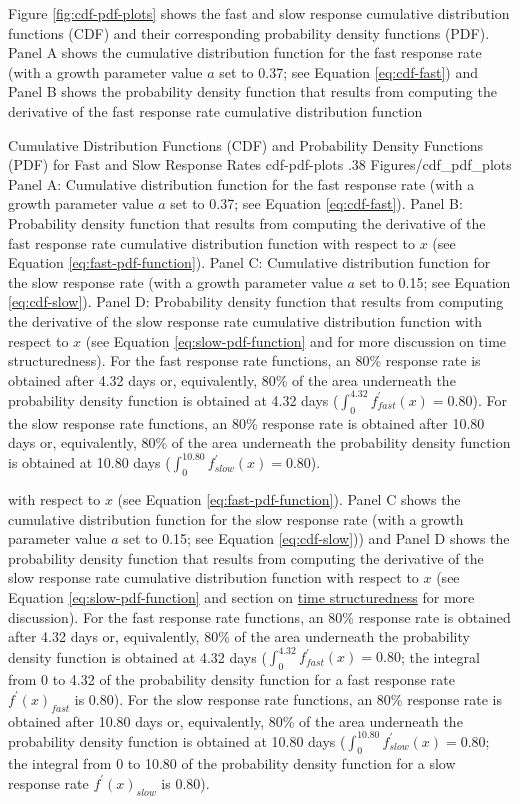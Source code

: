 \documentclass[
12pt, %
twoside,
english]{guelphthesis}
\begin{document}
Figure \ref{fig:cdf-pdf-plots} shows the fast and slow response
cumulative distribution functions (CDF) and their corresponding
probability density functions (PDF). Panel A shows the cumulative
distribution function for the fast response rate (with a growth
parameter value \(a\) set to 0.37; see Equation \ref{eq:cdf-fast}) and
Panel B shows the probability density function that results from
computing the derivative of the fast response rate cumulative
distribution function
\begin{apaFigure}
[portrait]
[samepage]
[0cm]
{Cumulative Distribution Functions (CDF) and Probability Density Functions (PDF) for Fast and Slow Response Rates}
{cdf-pdf-plots}
{.38}
{Figures/cdf_pdf_plots}
{Panel A: Cumulative distribution function for the fast response rate (with a growth parameter value $a$ set to 0.37; see Equation \ref{eq:cdf-fast}). Panel B: Probability density function that results from computing the derivative of the fast response rate cumulative distribution function with respect to $x$ (see Equation \ref{eq:fast-pdf-function}). Panel C: Cumulative distribution function for the slow response rate (with a growth parameter value $a$ set to 0.15; see Equation \ref{eq:cdf-slow}). Panel D: Probability density function that results from computing the derivative of the slow response rate cumulative distribution function with respect to $x$ (see Equation \ref{eq:slow-pdf-function} and  for more discussion on time structuredness). For the fast response rate functions, an 80\% response rate is obtained after 4.32 days or, equivalently, 80\% of the area underneath the probability density function is obtained at 4.32 days ($\int^{4.32}_{0} f_{fast}^\prime (x) = 0.80$). For the slow response rate functions, an 80\% response rate is obtained after 10.80 days or, equivalently, 80\% of the area underneath the probability density function is obtained at 10.80 days ($\int^{10.80}_{0} f_{slow}^\prime (x) = 0.80$).}
\end{apaFigure}
\noindent with respect to \(x\) (see Equation
\ref{eq:fast-pdf-function}). Panel C shows the cumulative distribution
function for the slow response rate (with a growth parameter value \(a\)
set to 0.15; see Equation \ref{eq:cdf-slow})) and Panel D shows the
probability density function that results from computing the derivative
of the slow response rate cumulative distribution function with respect
to \(x\) (see Equation \ref{eq:slow-pdf-function} and section on \protect\hyperlink{sec:time-structuredness}{time
structuredness} for more discussion). For the
fast response rate functions, an 80\% response rate is obtained after
4.32 days or, equivalently, 80\% of the area underneath the probability
density function is obtained at 4.32 days
(\(\int^{4.32}_{0} f_{fast}^\prime (x) = 0.80\); the integral from 0 to 4.32 of the probability density function for a fast response rate \(f^\prime(x)_{fast}\) is 0.80). For the slow response
rate functions, an 80\% response rate is obtained after 10.80 days or,
equivalently, 80\% of the area underneath the probability density
function is obtained at 10.80 days
(\(\int^{10.80}_{0} f_{slow}^\prime (x) = 0.80\); the integral from 0 to 10.80 of the probability density function for a slow response rate \(f^\prime(x)_{slow}\) is 0.80).
\end{document}
